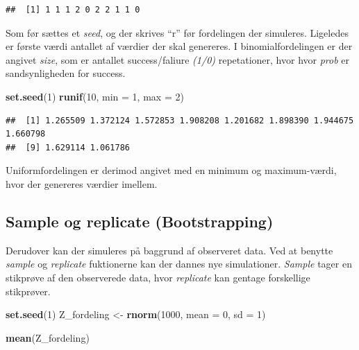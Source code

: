 \documentclass[]{book}
\newenvironment{Shaded}{\begin{snugshade}}{\end{snugshade}}
\newcommand{\DataTypeTok}[1]{\textcolor[rgb]{0.13,0.29,0.53}{#1}}
\newcommand{\DecValTok}[1]{\textcolor[rgb]{0.00,0.00,0.81}{#1}}
\newcommand{\KeywordTok}[1]{\textcolor[rgb]{0.13,0.29,0.53}{\textbf{#1}}}
\newcommand{\NormalTok}[1]{#1}
\newcommand{\StringTok}[1]{\textcolor[rgb]{0.31,0.60,0.02}{#1}}
\theoremstyle{definition}
\theoremstyle{definition}
\theoremstyle{definition}
\theoremstyle{remark}
\begin{document}
\begin{verbatim}
##  [1] 1 1 1 2 0 2 2 1 1 0
\end{verbatim}

Som før sættes et \emph{seed}, og der skrives ``r'' før fordelingen der simuleres. Ligeledes er første værdi antallet af værdier der skal genereres. I binomialfordelingen er der angivet \emph{size}, som er antallet success/faliure \emph{(1/0)} repetationer, hvor hvor \emph{prob} er sandsynligheden for success.

\begin{Shaded}
\begin{Highlighting}[]
\KeywordTok{set.seed}\NormalTok{(}\DecValTok{1}\NormalTok{)}
\KeywordTok{runif}\NormalTok{(}\DecValTok{10}\NormalTok{, }\DataTypeTok{min =} \DecValTok{1}\NormalTok{, }\DataTypeTok{max =} \DecValTok{2}\NormalTok{)}
\end{Highlighting}
\end{Shaded}

\begin{verbatim}
##  [1] 1.265509 1.372124 1.572853 1.908208 1.201682 1.898390 1.944675 1.660798
##  [9] 1.629114 1.061786
\end{verbatim}

Uniformfordelingen er derimod angivet med en minimum og maximum-værdi, hvor der genereres værdier imellem.

\hypertarget{sample-og-replicate-bootstrapping}{%
\subsection{Sample og replicate (Bootstrapping)}\label{sample-og-replicate-bootstrapping}}

Derudover kan der simuleres på baggrund af observeret data. Ved at benytte \emph{sample} og \emph{replicate} fuktionerne kan der dannes nye simulationer. \emph{Sample} tager en stikprøve af den observerede data, hvor \emph{replicate} kan gentage forskellige stikprøver.

\begin{Shaded}
\begin{Highlighting}[]
\KeywordTok{set.seed}\NormalTok{(}\DecValTok{1}\NormalTok{)}
\NormalTok{Z_fordeling <-}\StringTok{ }\KeywordTok{rnorm}\NormalTok{(}\DecValTok{1000}\NormalTok{, }\DataTypeTok{mean =} \DecValTok{0}\NormalTok{, }\DataTypeTok{sd =} \DecValTok{1}\NormalTok{)}

\KeywordTok{mean}\NormalTok{(Z_fordeling)}
\end{Highlighting}
\end{Shaded}
\end{document}
